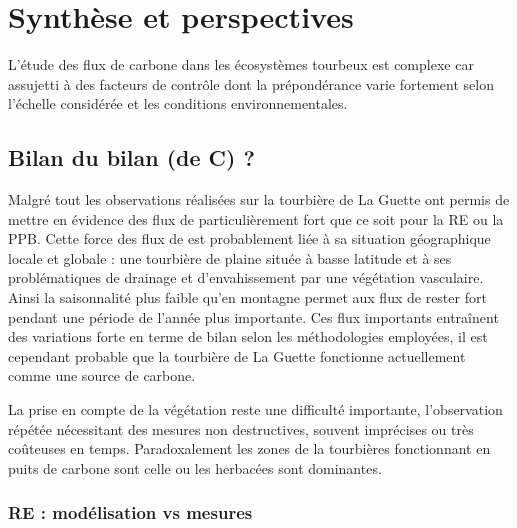 \chapter*{Synthèse et perspectives}
\newpage

L'étude des flux de carbone dans les écosystèmes tourbeux est complexe car assujetti à des facteurs de contrôle dont la prépondérance varie fortement selon l'échelle considérée et les conditions environnementales.

\section{Bilan du bilan (de C) ?}





Malgré tout les observations réalisées sur la tourbière de La Guette ont permis de mettre en évidence des flux de \coo particulièrement fort que ce soit pour la RE ou la PPB.
Cette force des flux de \coo est probablement liée à sa situation géographique locale et globale : une tourbière de plaine située à basse latitude et à ses problématiques de drainage et d'envahissement par une végétation vasculaire.
Ainsi la saisonnalité plus faible qu'en montagne permet aux flux de rester fort pendant une période de l'année plus importante.
Ces flux importants entraînent des variations forte en terme de bilan selon les méthodologies employées, il est cependant probable que la tourbière de La Guette fonctionne actuellement comme une source de carbone.


La prise en compte de la végétation reste une difficulté importante, l'observation répétée nécessitant des mesures non destructives, souvent imprécises ou très coûteuses en temps.
Paradoxalement les zones de la tourbières fonctionnant en puits de carbone sont celle ou les herbacées sont dominantes.

\subsection{RE : modélisation vs mesures}

